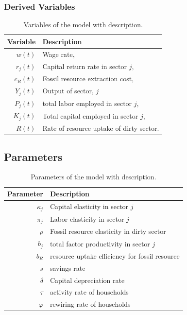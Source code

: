 \subsubsection{Derived Variables}

\begin{table}[H]
	\centering
	\begin{tabular}{r|l}
		Variable & Description \\\hline
		$w(t)$   & Wage rate, \\
		$r_j(t)$ & Capital return rate in sector $j$, \\
		$c_R(t)$ & Fossil resource extraction cost, \\
		$Y_j(t)$ & Output of sector, $j$ \\
		$P_j(t)$ & total labor employed in sector $j$, \\
		$K_j(t)$ & Total capital employed in sector $j$, \\
		$R(t)$ & Rate of resource uptake of dirty sector. \\
	\end{tabular}
	\caption{Variables of the model with description.}
	\label{tab:derived_variables}
\end{table}

\subsection{Parameters}

\begin{table}[H]
	\centering
	\begin{tabular}{r|l}
		Parameter & Description \\\hline
		$\kappa_j$ & Capital elasticity in sector $j$ \\
		$\pi_j$ & Labor elasticity in sector $j$ \\
		$\rho$ & Fossil resource elasticity in dirty sector \\
		$b_j$ & total factor productivity in sector $j$ \\
		$b_R$ & resource uptake efficiency for fossil resource \\
		$s$ & savings rate \\
		$\delta $ & Capital depreciation rate \\
		$\tau$ & activity rate of households \\
		$\varphi$ & rewiring rate of households
	\end{tabular}
	\caption{Parameters of the model with description.}
	\label{tab:parameters}
\end{table}

